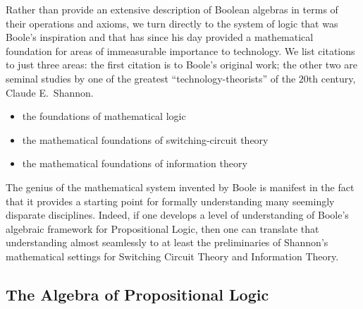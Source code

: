 Rather than provide an extensive description of Boolean algebras in
terms of their operations and axioms, we turn directly to the system
of logic that was Boole's inspiration and that has since his day
provided a mathematical foundation for areas of immeasurable
importance to technology.  We list citations to just three areas: the
first citation is to Boole's original work; the other two are seminal
studies by one of the greatest ``technology-theorists'' of the $20$th
century, Claude E.~Shannon. 
\begin{itemize}
\item
the foundations of mathematical logic \cite{Boole54}
\item
the mathematical foundations of switching-circuit theory
\cite{Shannon38}
\item
the mathematical foundations of information theory \cite{Shannon48}
\end{itemize}
The genius of the mathematical system invented by Boole is manifest in
the fact that it provides a starting point for formally understanding
many seemingly disparate disciplines.  Indeed, if one develops a level
of understanding of Boole's algebraic framework for Propositional
Logic, then one can translate that understanding almost seamlessly to
at least the preliminaries of Shannon's mathematical settings for
Switching Circuit Theory and Information Theory.
 



\subsection{The Algebra of Propositional Logic}
\label{sec:Propositional-logic}

